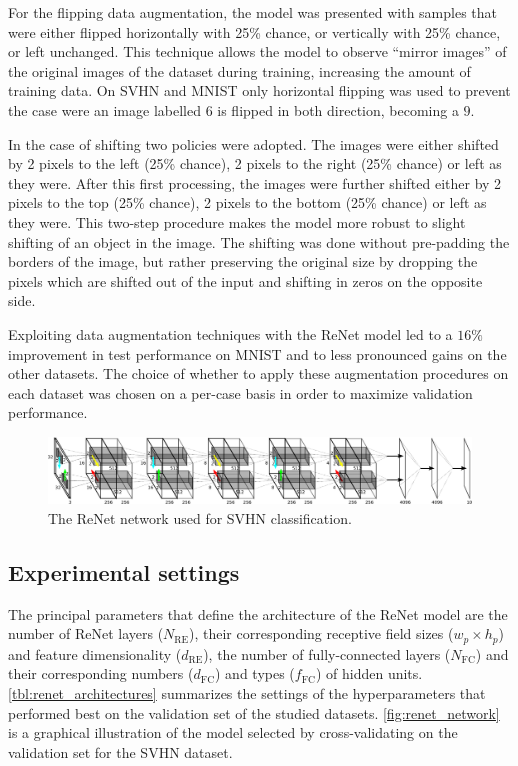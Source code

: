 For the flipping data augmentation, the model was presented with samples that
were either flipped horizontally with 25\% chance, or vertically with 25\%
chance, or left unchanged. This technique allows the model to observe ``mirror
images'' of the original images of the dataset during training, increasing the
amount of training data. On SVHN and MNIST only horizontal flipping was used
to prevent the case were an image labelled $6$ is flipped in both direction,
becoming a $9$.

In the case of shifting two policies were adopted. The images were either
shifted by 2 pixels to the left (25\% chance), 2 pixels to the right (25\%
chance) or left as they were. After this first processing, the images were
further shifted either by 2 pixels to the top (25\% chance), 2 pixels to the
bottom (25\% chance) or left as they were. This two-step procedure makes the
model more robust to slight shifting of an object in the image. The shifting
was done without pre-padding the borders of the image, but rather preserving
the original size by dropping the pixels which are shifted out of the input
and shifting in zeros on the opposite side.

Exploiting data augmentation techniques with the ReNet model led to a $16\%$
improvement in test performance on MNIST and to less pronounced gains on the
other datasets. The choice of whether to apply these augmentation procedures on
each dataset was chosen on a per-case basis in order to maximize validation
performance.

\begin{figure}[t]
    \centering
    \includegraphics[height=.14\textheight,width=\columnwidth]{img/renet/renet_svhn.pdf}
    \caption{The ReNet network used for SVHN classification.}
    \label{fig:renet_network}
\end{figure}

\subsection{Experimental settings}

The principal parameters that define the architecture of the ReNet model are
the number of ReNet layers ($N_{\text{RE}}$), their corresponding receptive
field sizes ($w_p \times h_p$) and feature dimensionality ($d_{\text{RE}}$),
the number of fully-connected layers ($N_{\text{FC}}$) and their corresponding
numbers ($d_{\text{FC}}$) and types ($f_{\text{FC}}$) of hidden units.
\autoref{tbl:renet_architectures} summarizes the settings of the
hyperparameters that performed best on the validation set of the studied
datasets. \autoref{fig:renet_network} is a graphical illustration of the model
selected by cross-validating on the validation set for the SVHN dataset.

